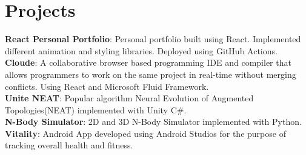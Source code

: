 \documentclass[letterpaper,10pt]{article}
\begin{document}
\section{Projects}
 \begin{itemize}[leftmargin=0.15in, label={}]
    \small{\item{
    \textbf{React Personal Portfolio}{: Personal portfolio built using React. Implemented different animation and styling libraries. Deployed using GitHub Actions.} \\
     \textbf{Cloude}{: A collaborative browser based programming IDE and compiler that allows programmers to work on the same project in real-time without merging conflicts. Using React and Microsoft Fluid Framework.} \\
     
     \textbf{Unite NEAT}{: Popular algorithm Neural Evolution of Augmented Topologies(NEAT) implemented with Unity C\#.} \\
     \textbf{N-Body Simulator}{: 2D and 3D N-Body Simulator implemented with Python.} \\
     \textbf{Vitality}{: Android App developed using Android Studios for the purpose of tracking overall health and fitness.} 
        
    }}

 \end{itemize}
\end{document}
